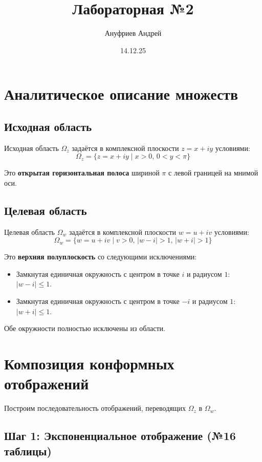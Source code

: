 \documentclass[12pt,a4paper]{article}
\title{Лабораторная №2}
\author{Ануфриев Андрей}
\date{14.12.25}
\begin{document}
\maketitle

\section{Аналитическое описание множеств}

\subsection{Исходная область}

Исходная область $\Omega_z$ задаётся в комплексной плоскости $z = x + iy$ условиями:
\begin{equation}
\Omega_z = \{z = x + iy \mid x > 0,\, 0 < y < \pi\}
\end{equation}

Это \textbf{открытая горизонтальная полоса} шириной $\pi$ с левой границей на мнимой оси.

\subsection{Целевая область}

Целевая область $\Omega_w$ задаётся в комплексной плоскости $w = u + iv$ условиями:
\begin{equation}
\Omega_w = \{w = u + iv \mid v > 0,\, |w - i| > 1,\, |w + i| > 1\}
\end{equation}

Это \textbf{верхняя полуплоскость} со следующими исключениями:
\begin{itemize}
    \item Замкнутая единичная окружность с центром в точке $i$ и радиусом $1$: $|w - i| \leq 1$.
    \item Замкнутая единичная окружность с центром в точке $-i$ и радиусом $1$: $|w + i| \leq 1$.
\end{itemize}

Обе окружности полностью исключены из области.

\section{Композиция конформных отображений}

Построим последовательность отображений, переводящих $\Omega_z$ в $\Omega_w$.

\subsection{Шаг 1: Экспоненциальное отображение (№16 таблицы)}
\end{document}
